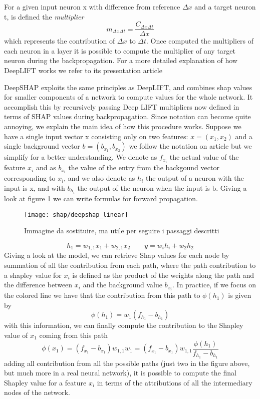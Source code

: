 \documentclass[10pt]{report}
\begin{document}
For a given input neuron x with difference from reference $\Delta x$ and a target neuron t, is defined the \emph{multiplier}
\[
m_{\Delta x \Delta t} = \frac{C_{\Delta x \Delta t}}{\Delta x}
\]
which represents the contribution of $\Delta x$ to $\Delta t$. Once computed the multipliers of each neuron in a layer it is possible to compute the multiplier of any target neuron during the backpropagation.
For a more detailed explanation of how DeepLIFT works we refer to its presentation article \cite{shrikumar-2017}

DeepSHAP exploits the same principles as DeepLIFT, and combines shap values for smaller components of a network to compute values for the whole network. It accomplish this by recursively passing Deep LIFT multipliers now defined in terms of SHAP values during backpropagation.
Since notation can become quite annoying, we explain the main idea of how this procedure works.
Suppose we have a single input vector x consisting only on two features: $x = (x_1, x_2)$ and a single background vector $b = (b_{x_1}, b_{x_2})$ we follow the notation on article \cite{chen2019} but we simplify for a better understanding.
We denote as $f_{x_i}$ the actual value of the feature $x_i$ and as $b_{x_i}$ the value of the entry from the backgound vector corresponding to $x_i$, and we also denote as $h_i$ the output of a neuron with the input is x, and with $b_{h_i}$ the output of the neuron when the input is b.
Giving a look at figure \ref{fig:deepshap_linear} we can write formulas for forward propagation.

\begin{figure}[h!]
\centering
\texttt{[image: shap/deepshap\_linear]}
\caption{Immagine da sostituire, ma utile per seguire i passaggi descritti}
\label{fig:deepshap_linear}
\end{figure}


\[
h_1 = w_{1, 1}x_1 + w_{2, 1}x_2 \qquad y = w_i h_i + w_2 h_2
\]
Giving a look at the model, we can retrieve Shap values for each node by summation of all the contribution from each path, where the path contribution to a shapley value for $x_i$ is defined as the product of the weights along the path and the difference between $x_i$ and the background value $b_{x_i}$.
In practice, if we focus on the colored line we have that the contribution from this path to $\phi(h_1)$ is given by
\[
\phi(h_1) = w_1 (f_{h_1} - b_{h_1})
\]
with this information, we can finally compute the contribution to the Shapley value of $x_1$ coming from this path
\begin{equation}
\phi(x_1) = (f_{x_1} - b_{x_1}) w_{1, 1} w_1 = (f_{x_1} - b_{x_1}) w_{1, 1} \frac{\phi(h_1)}{f_{h_1} - b_{h_1}}
\end{equation}
adding all contribution from all the possible paths (just two in the figure above, but much more in a real neural network), it is possible to compute the final Shapley value for a feature $x_i$ in terms of the attributions of all the intermediary nodes of the network.
\end{document}
